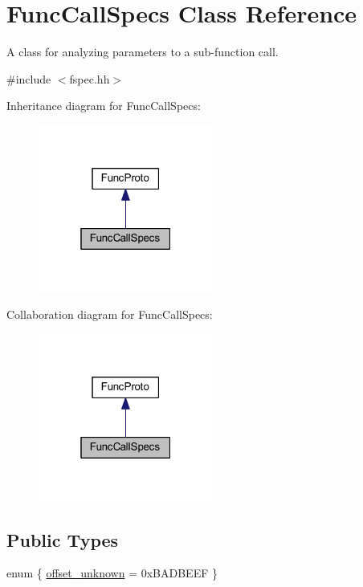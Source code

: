 \hypertarget{class_func_call_specs}{}\section{Func\+Call\+Specs Class Reference}
\label{class_func_call_specs}


A class for analyzing parameters to a sub-\/function call.  




{\ttfamily \#include $<$fspec.\+hh$>$}



Inheritance diagram for Func\+Call\+Specs\+:
\nopagebreak
\begin{figure}[H]
\begin{center}
\leavevmode
\includegraphics[width=163pt]{class_func_call_specs__inherit__graph}
\end{center}
\end{figure}


Collaboration diagram for Func\+Call\+Specs\+:
\nopagebreak
\begin{figure}[H]
\begin{center}
\leavevmode
\includegraphics[width=163pt]{class_func_call_specs__coll__graph}
\end{center}
\end{figure}
\subsection*{Public Types}
\begin{DoxyCompactItemize}
\item 
enum \{ \mbox{\hyperlink{class_func_call_specs_a5f7aaec10dc1e68d73a07eaf4cac2542a584ec7401809588c22798803bff5b796}{offset\+\_\+unknown}} = 0x\+B\+A\+D\+B\+E\+EF
 \}
\end{DoxyCompactItemize}
